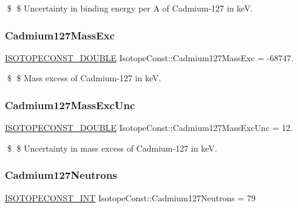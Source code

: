 \$ \$ Uncertainty in binding energy per A of Cadmium-\/127 in keV. \mbox{\label{group___isotope_const-_cadmium-_cd127_gaca22582ab8a8753fbeb8bed9e1212cc2}} 
\subsubsection{\texorpdfstring{Cadmium127\+Mass\+Exc}{Cadmium127MassExc}}
{\footnotesize\ttfamily \mbox{\hyperlink{group___isotope_const-_macros_ga8f45a7272ce02c0b4c65c44636ed719a}{I\+S\+O\+T\+O\+P\+E\+C\+O\+N\+S\+T\+\_\+\+D\+O\+U\+B\+LE}} Isotope\+Const\+::\+Cadmium127\+Mass\+Exc = -\/68747.}

\$ \$ Mass excess of Cadmium-\/127 in keV. \mbox{\label{group___isotope_const-_cadmium-_cd127_gaffe303a405ff739e36e36fbcde0b1539}} 
\subsubsection{\texorpdfstring{Cadmium127\+Mass\+Exc\+Unc}{Cadmium127MassExcUnc}}
{\footnotesize\ttfamily \mbox{\hyperlink{group___isotope_const-_macros_ga8f45a7272ce02c0b4c65c44636ed719a}{I\+S\+O\+T\+O\+P\+E\+C\+O\+N\+S\+T\+\_\+\+D\+O\+U\+B\+LE}} Isotope\+Const\+::\+Cadmium127\+Mass\+Exc\+Unc = 12.}

\$ \$ Uncertainty in mass excess of Cadmium-\/127 in keV. \mbox{\label{group___isotope_const-_cadmium-_cd127_ga7b5220a2d5a775e3617433987851a9da}} 
\subsubsection{\texorpdfstring{Cadmium127\+Neutrons}{Cadmium127Neutrons}}
{\footnotesize\ttfamily \mbox{\hyperlink{group___isotope_const-_macros_ga5f18360b3e99483a35c32d789e62621c}{I\+S\+O\+T\+O\+P\+E\+C\+O\+N\+S\+T\+\_\+\+I\+NT}} Isotope\+Const\+::\+Cadmium127\+Neutrons = 79}

